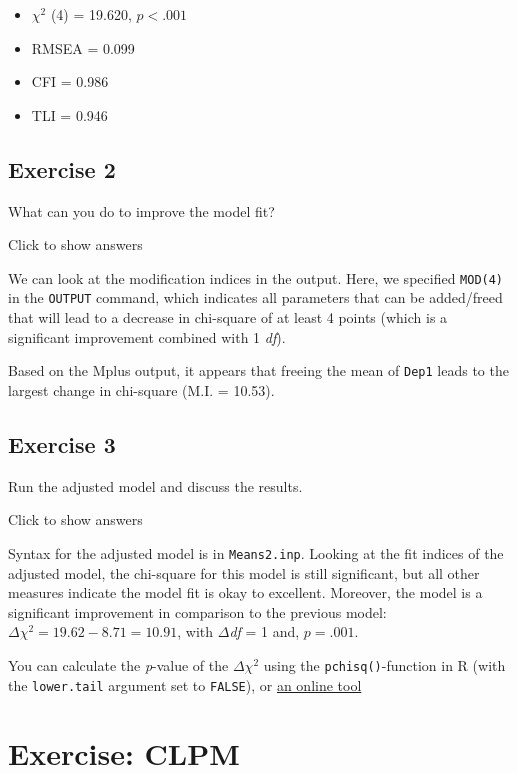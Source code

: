 \documentclass[
]{book}
\providecommand{\tightlist}{%
  \setlength{\itemsep}{0pt}\setlength{\parskip}{0pt}}
\begin{document}
\begin{itemize}
\tightlist
\item
  \(\chi^{2}\) (4) = 19.620, \(p < .001\)
\item
  RMSEA = 0.099
\item
  CFI = 0.986
\item
  TLI = 0.946
\end{itemize}

\hypertarget{exercise-2}{%
\subsection{Exercise 2}\label{exercise-2}}

What can you do to improve the model fit?

Click to show answers

We can look at the modification indices in the output. Here, we specified \texttt{MOD(4)} in the \texttt{OUTPUT} command, which indicates all parameters that can be added/freed that will lead to a decrease in chi-square of at least 4 points (which is a significant improvement combined with 1 \emph{df}).

Based on the Mplus output, it appears that freeing the mean of \texttt{Dep1} leads to the largest change in chi-square (M.I. = 10.53).

\hypertarget{exercise-3}{%
\subsection{Exercise 3}\label{exercise-3}}

Run the adjusted model and discuss the results.

Click to show answers

Syntax for the adjusted model is in \texttt{Means2.inp}. Looking at the fit indices of the adjusted model, the chi-square for this model is still significant, but all other measures indicate the model fit is okay to excellent. Moreover, the model is a significant improvement in comparison to the previous model: \(\Delta\chi^{2} = 19.62 - 8.71 = 10.91\), with \(\Delta\)\emph{df} = 1 and, \(p = .001\).

You can calculate the \emph{p}-value of the \(\Delta \chi^{2}\) using the \texttt{pchisq()}-function in R (with the \texttt{lower.tail} argument set to \texttt{FALSE}), or \href{http://www.fourmilab.ch/rpkp/experiments/analysis/chiCalc.html}{an online tool}

\hypertarget{exercise-clpm}{%
\section{Exercise: CLPM}\label{exercise-clpm}}
\end{document}
